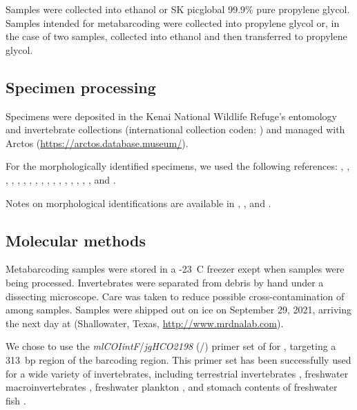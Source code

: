 \begin{multicols}{2}
Samples were collected into ethanol or SK picglobal 99.9\% pure propylene glycol. Samples intended for metabarcoding were collected into propylene glycol or, in the case of two samples, collected into ethanol and then transferred to propylene glycol.

\subsection{Specimen processing}

Specimens were deposited in the Kenai National Wildlife Refuge's entomology and invertebrate collections (international collection coden: ) and managed with Arctos (\url{https://arctos.database.museum/}).

For the morphologically identified specimens, we used the following references: \cite{Borroretal1989}, \cite{Brooks1957}, \cite{Burch1982}, \cite{Collet2008}, \cite{Durfee2005}, \cite{Haneyetal2013}, \cite{Hatch1953}, \cite{Herrington1962}, \cite{Kenner2009}, \cite{Mackie2007}, \cite{Marx1957}, \cite{MerrittCummins1996}, \cite{Merrittetal2008}, \cite{Reid1987}, \cite{Rileyetal2002}, \cite{Roughley2000}, \cite{Wallis1933}, and \cite{White1983}.

Notes on morphological identifications are available in \citet{Artaiz2021}, \citet{Bowser2022b}, and \citet{Bowser2022d}.

\subsection{Molecular methods}

Metabarcoding samples were stored in a -23~\textdegree{}C freezer exept when samples were being processed. Invertebrates were separated from debris by hand under a dissecting microscope. Care was taken to reduce possible cross-contamination of  among samples. Samples were shipped out on ice on September 29, 2021, arriving the next day at  (Shallowater, Texas, \url{http://www.mrdnalab.com}).

We chose to use the \textit{mlCOIintF}/\textit{jgHCO2198} (\-/\-) primer set of \citet{Lerayetal2013} for , targeting a 313~bp region of the   barcoding region. This primer set has been successfully used for a wide variety of invertebrates, including terrestrial invertebrates \citep{Bowseretal2020}, freshwater macroinvertebrates \citep{Hajibabaeietal2019}, freshwater plankton \citep{Yangetal2017}, and stomach contents of freshwater fish \citep{BowserBowser2020}.


\end{multicols}
